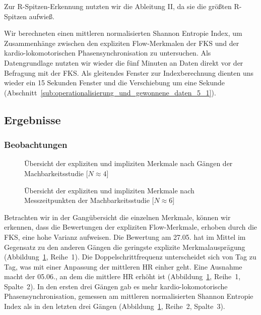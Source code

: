Zur R-Spitzen-Erkennung nutzten wir die Ableitung II, da sie die größten R-Spitzen aufwieß. 

Wir berechneten einen mittleren normalisierten Shannon Entropie Index, um Zusammenhänge zwischen den expliziten Flow-Merkmalen der \ac{FKS} und der kardio-lokomotorischen Phasensynchronisation zu untersuchen. Als Datengrundlage nutzten wir wieder die fünf Minuten an Daten direkt vor der Befragung mit der \ac{FKS}. Als gleitendes Fenster zur Indexberechnung dienten uns wieder ein 15 Sekunden Fenster und die Verschiebung um eine Sekunde (Abschnitt~\ref{sub:operationalisierung_und_gewonnene_daten_5_1}).

\subsection{Ergebnisse} 

\label{sub:ergebnisse_5_2}

\subsubsection{Beobachtungen} 

\label{ssub:beobachtungen_5_2} 
\begin{figure}
	[!htb]  \caption[Übersicht der expliziten und impliziten Merkmale nach Gängen (Machbarkeitsstudie: Gehen)]{Übersicht der expliziten und impliziten Merkmale nach Gängen der Machbarkeitsstudie [$N \approx 4$]} \label{fig:ubersicht_nach_gangen_2} 
\end{figure}
\begin{figure}
	[!htb]  \caption[Übersicht der expliziten und impliziten Merkmale nach Messzeitpunkten (Machbarkeitsstudie: Gehen)]{Übersicht der expliziten und impliziten Merkmale nach Messzeitpunkten der Machbarkeitsstudie [$N \approx 6$]} \label{fig:ubersicht_nach_messzeitpunkten_2} 
\end{figure}

Betrachten wir in der Gangübersicht die einzelnen Merkmale, können wir erkennen, dass die Bewertungen der expliziten Flow-Merkmale, erhoben durch die \ac{FKS}, eine hohe Varianz aufweisen. Die Bewertung am 27.05. hat im Mittel im Gegensatz zu den anderen Gängen die geringste explizite Merkmalausprägung (Abbildung~\ref{fig:ubersicht_nach_gangen_2}, Reihe~1). Die Doppelschrittfrequenz unterscheidet sich von Tag zu Tag, was mit einer Anpassung der mittleren \ac{HR} einher geht. Eine Ausnahme macht der 05.06., an dem die mittlere \ac{HR} erhöht ist (Abbildung~\ref{fig:ubersicht_nach_gangen_2}, Reihe~1, Spalte~2). In den ersten drei Gängen gab es mehr kardio-lokomotorische Phasensynchronisation, gemessen am mittleren normalisierten Shannon Entropie Index als in den letzten drei Gängen (Abbildung~\ref{fig:ubersicht_nach_gangen_2}, Reihe~2, Spalte~3).

